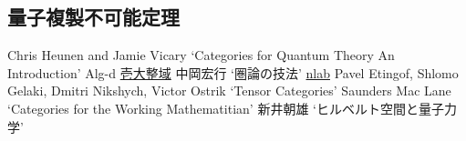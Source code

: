 \documentclass[a4paper,12pt]{ltjsarticle}
\theoremstyle{break}
\numberwithin{equation}{section}
\begin{document}
\subsection{量子複製不可能定理}

\newpage

\begin{thebibliography}{99}
   Chris Heunen and Jamie Vicary `Categories for Quantum Theory An Introduction'
   Alg-d \href{http://alg-d.com/}{壱大整域}
   中岡宏行 `圏論の技法'
   \href{https://ncatlab.org/nlab/show/HomePage}{nlab}
   Pavel Etingof, Shlomo Gelaki, Dmitri Nikshych, Victor Ostrik `Tensor Categories'
   Saunders Mac Lane `Categories for the Working Mathematitian'
   新井朝雄 `ヒルベルト空間と量子力学'
\end{thebibliography}
\end{document}
